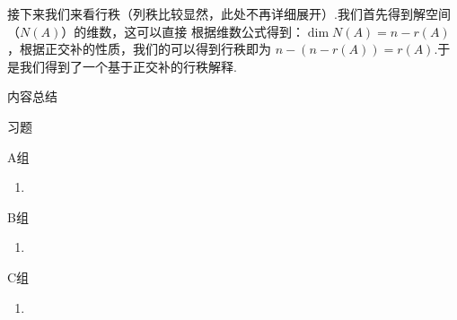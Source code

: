 接下来我们来看行秩（列秩比较显然，此处不再详细展开）.我们首先得到解空间（$N(A)$）的维数，这可以直接
根据维数公式得到：$\dim N(A) =n-r(A)$，根据正交补的性质，我们的可以得到行秩即为
$n-(n-r(A))=r(A)$.于是我们得到了一个基于正交补的行秩解释.

\vspace{2ex}
\centerline{\heiti \Large 内容总结}

\vspace{2ex}

\centerline{\heiti \Large 习题}
\vspace{2ex}
{\kaishu }
\begin{flushright}
    \kaishu

\end{flushright}
\centerline{\heiti A组}
\begin{enumerate}
    \item
\end{enumerate}
\centerline{\heiti B组}
\begin{enumerate}
    \item
\end{enumerate}
\centerline{\heiti C组}
\begin{enumerate}
    \item
\end{enumerate}
